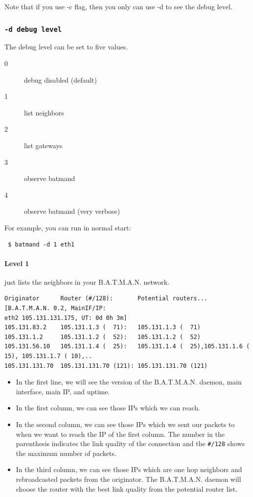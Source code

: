 \documentclass[
	12pt,
	a4paper,
	twoside,
	english,
	headsepline,
	footnosepline,
	automark,
	normalheadings,
	openany,
	cleardoubleplain,
	abstracton,
	idxtotoc,
	liststotoc,
	bibtotoc,
 	BCOR8mm,
]{scrartcl}
\newcommand{\subsubsectionttt}[1]{\subsubsection{\texttt{#1}}}
\begin{document}
Note that if you use -c flag, then you only can use -d to see the debug level.

\subsubsectionttt{-d debug level}
The debug level can be set to five values.

\begin{description}
 \item[0] debug disabled (default)
 \item[1] list neighbors
 \item[2] list gateways
 \item[3] observe batmand
 \item[4] observe batmand (very verbose)
\end{description}

For example, you can run in normal start:
\begin{verbatim}
 $ batmand -d 1 eth1
\end{verbatim}

\paragraph*{Level 1}
just lists the neighbors in your B.A.T.M.A.N. network.

\begin{lstlisting}[basicstyle=\footnotesize,	frame=single, columns= flexible]
Originator      Router (#/128):       Potential routers... [B.A.T.M.A.N. 0.2, MainIF/IP:
eth2 105.131.131.175, UT: 0d 0h 3m]
105.131.83.2    105.131.1.3 (  71):   105.131.1.3 (  71)
105.131.1.2     105.131.1.2 (  52):   105.131.1.2 (  52)
105.131.56.10   105.131.1.4 (  25):   105.131.1.4 (  25),105.131.1.6 ( 15), 105.131.1.7 ( 10),..
105.131.131.70  105.131.131.70 (121): 105.131.131.70 (121)
\end{lstlisting}

\begin{itemize}
\item In the first line, we will see the version of the B.A.T.M.A.N. daemon,
      main interface, main IP, and uptime.
\item In the first column, we can see those IPs which we can reach.
\item In the second column, we can see those IPs which we sent our packets to
      when we want to reach the IP of the first column. The number in the
      parenthesis indicates the link quality of the connection and the
      \verb|#/128| shows the maximum number of packets.
\item In the third column, we can see those IPs which are one hop neighbors and
      rebroadcasted packets from the originator. The B.A.T.M.A.N. daemon will
      choose the router with the best link quality from the potential router
      list.
\end{itemize}
\end{document}
